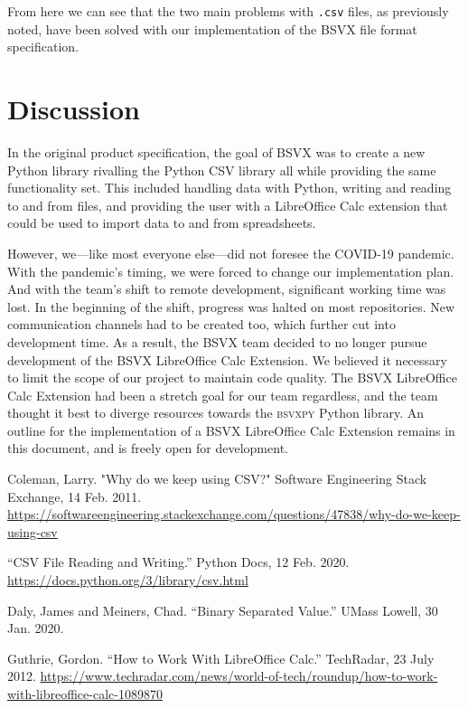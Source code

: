\documentclass[10pt]{article}
\begin{document}
\indent{}
From here we can see that the two main problems with \texttt{.csv} files, as previously noted, have been solved with our implementation of the BSVX file format specification.

\section*{Discussion}

In the original product specification, the goal of BSVX was to create a new Python library rivalling the Python CSV library all while providing the same functionality set.
This included handling data with Python, writing and reading to and from files, and providing the user with a LibreOffice Calc extension that could be used to import data to and from spreadsheets.

\indent{}
However, we---like most everyone else---did not foresee the COVID-19 pandemic. 
With the pandemic's timing, we were forced to change our implementation plan.
And with the team's shift to remote development, significant working time was lost.
In the beginning of the shift, progress was halted on most repositories.
New communication channels had to be created too, which further cut into development time.
As a result, the BSVX team decided to no longer pursue development of the BSVX LibreOffice Calc Extension.
We believed it necessary to limit the scope of our project to maintain code quality.
The BSVX LibreOffice Calc Extension had been a stretch goal for our team regardless, and the team thought it best to diverge resources towards the \textsc{bsvxpy} Python library.
An outline for the implementation of a BSVX LibreOffice Calc Extension remains in this document, and is freely open for development.


\clearpage
{}
\printnoidxglossary[nonumberlist]

\clearpage
\begin{thebibliography}{9}

    Coleman, Larry.
    "Why do we keep using CSV?"
    Software Engineering Stack Exchange,
    14 Feb. 2011.
    \url{https://softwareengineering.stackexchange.com/questions/47838/why-do-we-keep-using-csv}

    “CSV File Reading and Writing.”
    Python Docs,
    12 Feb. 2020.
    \url{https://docs.python.org/3/library/csv.html}

    Daly, James and Meiners, Chad.
    “Binary Separated Value.”
    UMass Lowell,
    30 Jan. 2020.

    Guthrie, Gordon.
    “How to Work With LibreOffice Calc.”
    TechRadar,
    23 July 2012.
    \url{https://www.techradar.com/news/world-of-tech/roundup/how-to-work-with-libreoffice-calc-1089870}
  
\end{thebibliography}
\end{document}
